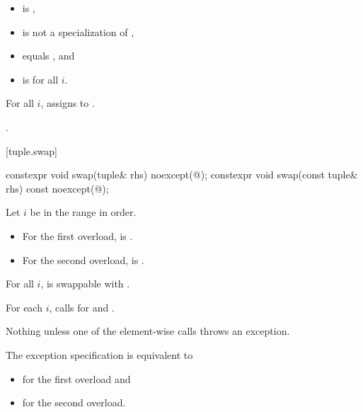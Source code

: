 \begin{itemdescr}
\pnum
\constraints
\begin{itemize}
\item
{}
is ,

\item
{}
is not a specialization of ,

\item
{}
equals , and

\item
{}
is  for all $i$.
\end{itemize}

\pnum
\effects
For all $i$, assigns
 to .

\pnum
\returns
{}.
\end{itemdescr}

[tuple.swap]{}

%
\begin{itemdecl}
constexpr void swap(tuple& rhs) noexcept(@\seebelow@);
constexpr void swap(const tuple& rhs) const noexcept(@\seebelow@);
\end{itemdecl}

\begin{itemdescr}
\pnum
Let $i$ be in the range  in order.

\pnum
\mandates
\begin{itemize}
\item
For the first overload,
 is .
\item
For the second overload,
 is .
\end{itemize}

\pnum
\expects
For all $i$,  is swappable with .

\pnum
\effects
For each $i$, calls  for  and .

\pnum
\throws
Nothing unless one of the element-wise  calls throws an exception.

\pnum
\remarks
The exception specification is equivalent to
\begin{itemize}
\item
{} for the first overload and
\item
{} for the second overload.
\end{itemize}
\end{itemdescr}

